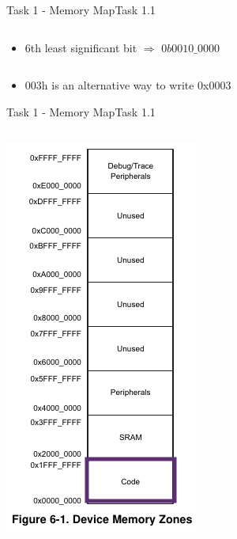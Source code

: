 {\begin{frame}[allowframebreaks]{Task 1 - Memory Map}{Task 1.1}
\begin{solution}
\begin{columns}
\begin{column}{0.6\paperwidth}
\begin{itemize}
          \item 6th least significant bit $\Rightarrow$ $0b0010\_0000$
        \end{itemize}
      \end{column}
    \end{columns}
  \end{solution}
  \begin{Sidenote}
    \begin{itemize}
      \item 003h is an alternative way to write 0x0003
    \end{itemize}
  \end{Sidenote}
\end{frame}

\begin{frame}[allowframebreaks]{Task 1 - Memory Map}{Task 1.1\vspace{0.25cm}}
  \begin{solutionnoinc}
    \begin{columns}
      \begin{column}{0.3\paperwidth}
        \centering
        \includegraphics[height=0.4\paperheight]{./figures/code.png}

\end{column}
\end{columns}
\end{solutionnoinc}
\end{frame}}
